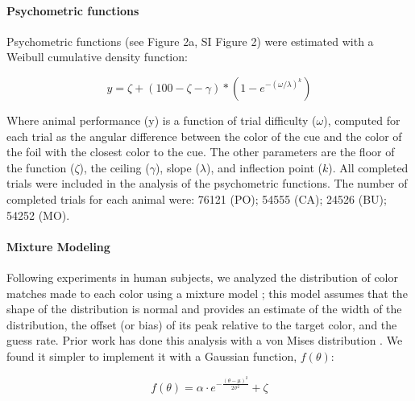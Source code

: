 \paragraph{Psychometric functions}

Psychometric functions (see Figure 2a, SI Figure 2) were estimated with a Weibull cumulative density function: %

\begin{equation} \label{eq:Weibull}
    y=\zeta+(100-\zeta-\gamma) *\left(1-e^{-(\omega / \lambda)^k}\right) 
\end{equation}

Where animal performance (y) is a function of trial difficulty ($\omega$), computed for each trial as the angular difference between the color of the cue and the color of the foil with the closest color to the cue. 
The other parameters are the floor of the function ($\zeta$), the ceiling ($\gamma$), slope ($\lambda$), and inflection point ($k$). 
All completed trials were included in the analysis of the psychometric functions. 
The number of completed trials for each animal were: 76121 (PO); 54555 (CA); 24526 (BU); 54252 (MO). 

\paragraph{Mixture Modeling}\label{para:MixtureModeling}

Following experiments in human subjects, we analyzed the distribution of color matches made to each color using a mixture model \citep{zhang_discrete_2008,bae_why_2015}; this model assumes that the shape of the distribution is normal and provides an estimate of the width of the distribution, the offset (or bias) of its peak relative to the target color, and the guess rate.
Prior work has done this analysis with a von Mises distribution \citep{zhang_discrete_2008,bae_why_2015}.
We found it simpler to implement it with a Gaussian function, $f(\theta)$:



\begin{equation} \label{eq:GaussianEquation}
    f(\theta) = {\alpha} \cdot e^{-\frac{(\theta-{\mu})^2}{2{\sigma}^2}} + {\zeta}        
\end{equation}

